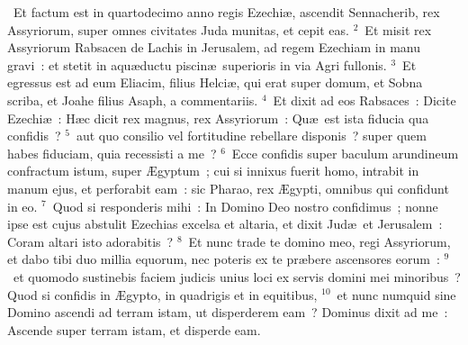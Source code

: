 ~Et factum est in quartodecimo anno regis Ezechi\ae , ascendit Sennacherib, rex Assyriorum, super omnes civitates Juda munitas, et cepit eas.
${}^{2}$~Et misit rex Assyriorum Rabsacen de Lachis in Jerusalem, ad regem Ezechiam in manu gravi~: et stetit in aqu\ae ductu piscin\ae\ superioris in via Agri fullonis.
${}^{3}$~Et egressus est ad eum Eliacim, filius Helci\ae , qui erat super domum, et Sobna scriba, et Joahe filius Asaph, a commentariis.
${}^{4}$~Et dixit ad eos Rabsaces~: Dicite Ezechi\ae~: H\ae c dicit rex magnus, rex Assyriorum~: Qu\ae\ est ista fiducia qua confidis~?
${}^{5}$~aut quo consilio vel fortitudine rebellare disponis~? super quem habes fiduciam, quia recessisti a me~?
${}^{6}$~Ecce confidis super baculum arundineum confractum istum, super \AE gyptum~; cui si innixus fuerit homo, intrabit in manum ejus, et perforabit eam~: sic Pharao, rex \AE gypti, omnibus qui confidunt in eo.
${}^{7}$~Quod si responderis mihi~: In Domino Deo nostro confidimus~; nonne ipse est cujus abstulit Ezechias excelsa et altaria, et dixit Jud\ae\ et Jerusalem~: Coram altari isto adorabitis~?
${}^{8}$~Et nunc trade te domino meo, regi Assyriorum, et dabo tibi duo millia equorum, nec poteris ex te pr\ae bere ascensores eorum~:
${}^{9}$~et quomodo sustinebis faciem judicis unius loci ex servis domini mei minoribus~? Quod si confidis in \AE gypto, in quadrigis et in equitibus,
${}^{10}$~et nunc numquid sine Domino ascendi ad terram istam, ut disperderem eam~? Dominus dixit ad me~: Ascende super terram istam, et disperde eam.


